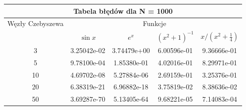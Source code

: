 \documentclass{article}
\begin{document}
\renewcommand{\arraystretch}{1.5}  
\begin{center}
	\begin{tabular}{||c||c|c|c|c||} \hline
		\multicolumn{5}{||c||}{Tabela błędów dla N = 1000} \\ \hline
		Węzły Czebyszewa 	& \multicolumn{4}{|c||}{Funkcje} \\ \cline{2-5}
		& $\sin x$ & $e^x$ & $(x^{2}+1)^{-1}$ & $x/(x^{2} + \frac{1}{4})$ \\ \hline					
		3 		& 3.25042e-02 &  3.74479e+00 &  6.00596e-01 & 9.36666e-01 \\ \hline
		5 		& 9.78100e-04 &  1.85380e-01 &  4.02016e-01 & 8.29971e-01 \\ \hline
		10  	& 4.69702e-08 &  5.27884e-06 &  2.69159e-01 & 3.25376e-01 \\ \hline
		20  	& 6.38319e-21 &  6.96882e-18 &  3.75819e-02 & 8.38636e-02 \\ \hline
		50  	& 3.69287e-70 &  5.13405e-64 &  9.68221e-05 & 7.14083e-04 \\ \hline
	\end{tabular}
\end{center}
\renewcommand{\arraystretch}{1}
\end{document}
